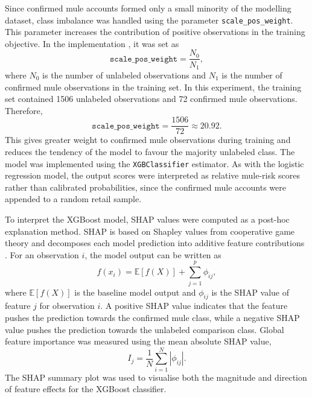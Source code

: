 Since confirmed mule accounts formed only a small minority of the modelling dataset, class
imbalance was handled using the parameter \texttt{scale\_pos\_weight}. This parameter increases the
contribution of positive observations in the training objective. In the implementation \cite{xgboost_parameters} , it was set
as
\[
\texttt{scale\_pos\_weight} = \frac{N_0}{N_1},
\]
where \(N_0\) is the number of unlabeled observations and \(N_1\) is the number of confirmed mule
observations in the training set. In this experiment, the training set contained 1506 unlabeled
observations and 72 confirmed mule observations. Therefore,
\[
\texttt{scale\_pos\_weight}
=
\frac{1506}{72}
\approx 20.92.
\]
This gives greater weight to confirmed mule observations during training and reduces the
tendency of the model to favour the majority unlabeled class.
The model was implemented using the \texttt{XGBClassifier} estimator. As with the
logistic regression model, the output scores were interpreted as relative mule-risk
scores rather than calibrated probabilities, since the confirmed mule accounts were
appended to a random retail sample.

To interpret the XGBoost model, SHAP values were computed as a post-hoc explanation method. SHAP is based on Shapley values from cooperative game theory and decomposes each model prediction into additive feature contributions \citep{lundberg2017unified}. For an observation \(i\), the model output can be written as
\[
f(x_i) = \mathbb{E}[f(X)] + \sum_{j=1}^{p} \phi_{ij},
\]
where \(\mathbb{E}[f(X)]\) is the baseline model output and \(\phi_{ij}\) is the SHAP value of feature \(j\) for observation \(i\). A positive SHAP value indicates that the feature pushes the prediction towards the confirmed mule class, while a negative SHAP value pushes the prediction towards the unlabeled comparison class. Global feature importance was measured using the mean absolute SHAP value,
\[
I_j = \frac{1}{N}\sum_{i=1}^{N} |\phi_{ij}|.
\]
The SHAP summary plot was used to visualise both the magnitude and direction of feature effects for the XGBoost classifier.